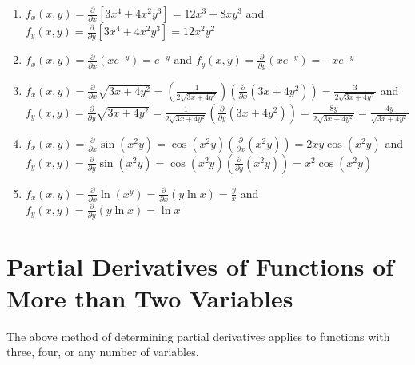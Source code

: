\begin{Answer}[ref = first]
\begin{enumerate}
    \item $f_x(x, y) = \frac{\partial}{\partial x} \left[ 3x^4 + 4x^2y^3 
    \right] = 12x^3 + 8xy^3$ and $f_y(x, y) = \frac{\partial}{\partial y} 
    \left[ 3x^4 + 4x^2y^3 \right] = 12x^2y^2$
    \item $f_x(x, y) = \frac{\partial}{\partial x} \left(xe^{-y} \right) = 
    e^{-y}$ and $f_y(x, y) = \frac{\partial}{\partial y} \left(xe^{-y} \right) 
    = -xe^{-y}$
    \item $f_x(x, y) = \frac{\partial}{\partial x} \sqrt{3x + 4y^2} = \left( 
    \frac{1}{2\sqrt{3x + 4y^2}} \right) \left( \frac{\partial}{\partial x } 
    \left(3x + 4y^2 \right) \right) = \frac{3}{2\sqrt{3x + 4y^2}}$ and $f_y(x, 
    y) = \frac{\partial}{\partial y} \sqrt{3x + 4y^2} = \frac{1}{2\sqrt{3x + 
    4y^2}} \left( \frac{\partial}{\partial y} \left(3x + 4y^2 \right) \right) 
    = \frac{8y}{2\sqrt{3x + 4y^2}} = \frac{4y}{\sqrt{3x + 4y^2}}$
    \item $f_x(x, y) = \frac{\partial}{\partial x} \sin{ \left(x^2y \right)} = 
    \cos{\left( x^2y \right)} \left( \frac{\partial}{\partial x} \left(x^2y 
    \right) \right) = 2xy\cos{\left(x^2y \right)}$ and $f_y(x, y) = \frac{
    \partial}{\partial y} \sin{ \left(x^2y \right)} = \cos{ \left(x^2y \right)}
    \left( \frac{\partial}{\partial y} \left(x^2 y \right) \right) = x^2\cos{ 
    \left( x^2 y \right)}$
    \item $f_x(x, y) = \frac{\partial}{\partial x} \ln{ \left( x^y \right)} = 
    \frac{\partial}{\partial x} \left(y \ln{x} \right) = \frac{y}{x}$ and $f_y(
    x, y) = \frac{\partial}{\partial y} \left(y \ln{x} \right) = \ln{x}$
\end{enumerate}
\end{Answer}

\section{Partial Derivatives of Functions of More than Two Variables}
The above method of determining partial derivatives applies to functions with 
three, four, or any number of variables.

